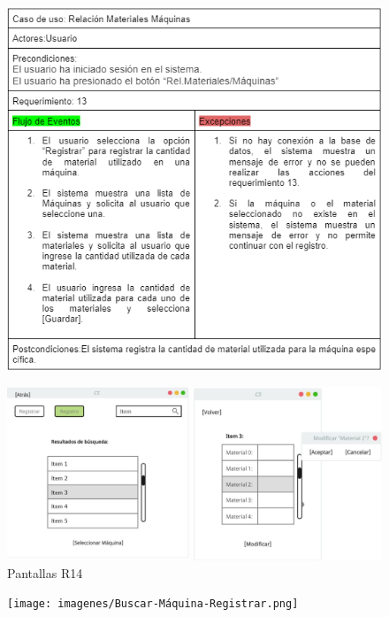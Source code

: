 \documentclass{article}
\begin{document}
    \begin{figure}
        \includegraphics[width=0.9\linewidth]{imagenes/img_diagram_usecase.png}  
    \end{figure}
    
    \begin{figure}
        \begin{center}
            \includegraphics[width=0.9\linewidth]{imagenes/pan_registro_lista-modificar.jpg}
            \caption{Pantallas R14}
        \end{center}
    \end{figure}
    
    \begin{figure}
        \begin{center}
            \texttt{[image: imagenes/Buscar-Máquina-Registrar.png]}  
        \end{center}
    \end{figure}
    
\end{document}
